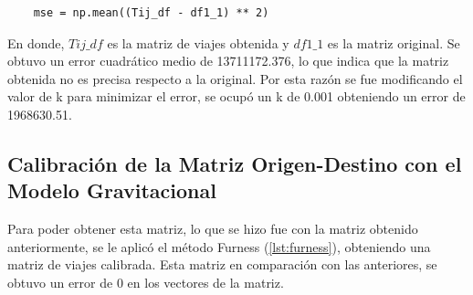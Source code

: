 \documentclass[letterpaper,12pt]{article}
\begin{document}
\begin{lstlisting}
    mse = np.mean((Tij_df - df1_1) ** 2)
\end{lstlisting}

En donde, $Tij\_df$ es la matriz de viajes obtenida y $df1\_1$ es la matriz original. Se obtuvo un error cuadrático medio de 13711172.376, lo que indica que la matriz obtenida no es precisa respecto a la original. Por esta razón se fue modificando el valor de k para minimizar el error, se ocupó un k de 0.001 obteniendo un error de 1968630.51. 

\subsection{Calibración de la Matriz Origen-Destino con el Modelo Gravitacional}

Para poder obtener esta matriz, lo que se hizo fue con la matriz obtenido anteriormente, se le aplicó el método Furness (\ref{lst:furness}), obteniendo una matriz de viajes calibrada. Esta matriz en comparación con las anteriores, se obtuvo un error de 0 en los vectores de la matriz.
\end{document}
